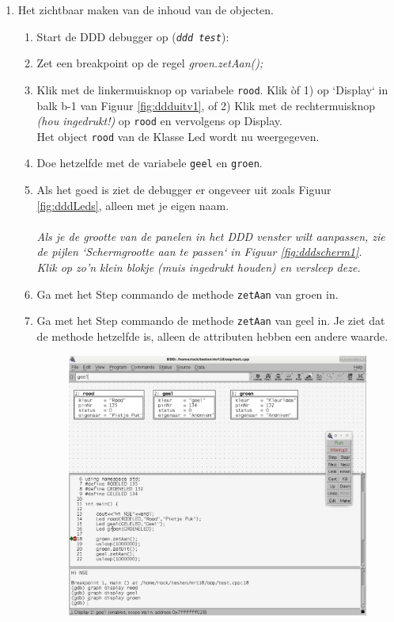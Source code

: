 \begin{enumerate} [label=\alph*]
\begin{enumerate} [label=\roman*]
\end{enumerate}
\newpage
\item Het zichtbaar maken van de inhoud van de objecten.


\begin{enumerate} [label=\roman*]
	\item Start de DDD debugger op (\texttt{\textit{ddd test}}):
		\item Zet een breakpoint op de regel	\textit{groen.zetAan();} 
		\item Klik met de linkermuisknop op variabele \texttt{rood}. Klik òf 1) op `Display` in balk b-1 van Figuur \ref{fig:ddduitv1}, of 2) Klik met de rechtermuisknop \textit{(hou ingedrukt!)} op \texttt{rood} en vervolgens op Display. \\Het object \texttt{rood} van de Klasse Led wordt nu weergegeven.
		\item Doe hetzelfde met de variabele \texttt{geel} en \texttt{groen}.
		\item Als het goed is ziet de debugger er ongeveer uit zoals Figuur \ref{fig:dddLeds}, alleen met je \textcolor{BrickRed}{eigen naam}.\\\\
		\emph{Als je de grootte van de panelen in het DDD venster wilt aanpassen, zie de pijlen `\textit{Schermgrootte aan te passen}` in Figuur \ref{fig:dddscherm1}.\\Klik op zo'n klein blokje (muis ingedrukt houden) en versleep deze.}
	    \item Ga met het Step commando de methode \texttt{zetAan} van groen in.
		\item Ga met het Step commando de methode \texttt{zetAan} van geel in. Je ziet dat de methode hetzelfde is, alleen de attributen hebben een andere waarde.
		  \begin{figure}[h!]
		 	\captionsetup{justification=centering}
		 	\includegraphics[width=0.9 \linewidth]{figuren/LedDDD}

\end{figure}
\end{enumerate}
\end{enumerate}
